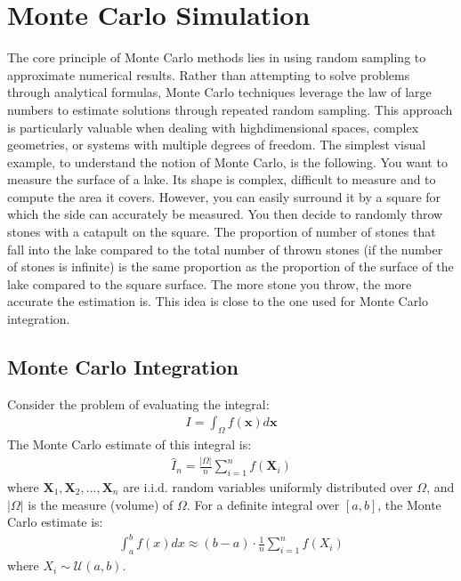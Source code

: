 \documentclass[letterpaper,10pt,english]{jupyterBook}
\begin{document}
\section{Monte Carlo Simulation}
\label{\detokenize{01:monte-carlo-simulation}}
\sphinxAtStartPar
The core principle of Monte Carlo methods lies in using random sampling to approximate numerical results. Rather than attempting to solve problems through analytical formulas, Monte Carlo techniques leverage the law of large numbers to estimate solutions through repeated random sampling. This approach is particularly valuable when dealing with high\sphinxhyphen{}dimensional spaces, complex geometries, or systems with multiple degrees of freedom. The simplest visual example, to understand the notion of Monte Carlo, is the following. You want to measure the surface of a lake. Its shape is complex, difficult to measure and to compute the area it covers. However, you can easily surround it by a square for which the side can accurately be measured. You then decide to randomly throw stones with a catapult on the square. The proportion of number of stones that fall into the lake compared to the total number of thrown stones (if the number of stones is infinite) is the same proportion as the proportion of the surface of the lake compared to the square surface. The more stone you throw, the more accurate the estimation is. This idea is close to the one used for Monte Carlo integration.


\subsection{Monte Carlo Integration}
\label{\detokenize{01:monte-carlo-integration}}
\sphinxAtStartPar
Consider the problem of evaluating the integral:
\begin{equation*}
\begin{split}
    I = \int_{\Omega} f(\mathbf{x}) d\mathbf{x}
\end{split}
\end{equation*}
\sphinxAtStartPar
The Monte Carlo estimate of this integral is:
\begin{equation*}
\begin{split}
    \hat{I}_n = \frac{|\Omega|}{n} \sum_{i=1}^{n} f(\mathbf{X}_i)
\end{split}
\end{equation*}
\sphinxAtStartPar
where \(\mathbf{X}_1, \mathbf{X}_2, \dots, \mathbf{X}_n\) are i.i.d. random variables uniformly distributed over \(\Omega\), and \(|\Omega|\) is the measure (volume) of \(\Omega\).
For a definite integral over \([a, b]\), the Monte Carlo estimate is:
\begin{equation*}
\begin{split}
    \int_{a}^{b} f(x) dx \approx (b - a) \cdot \frac{1}{n} \sum_{i=1}^{n} f(X_i)
\end{split}
\end{equation*}
\sphinxAtStartPar
where \(X_i \sim \mathcal{U}(a, b)\).
\end{document}
